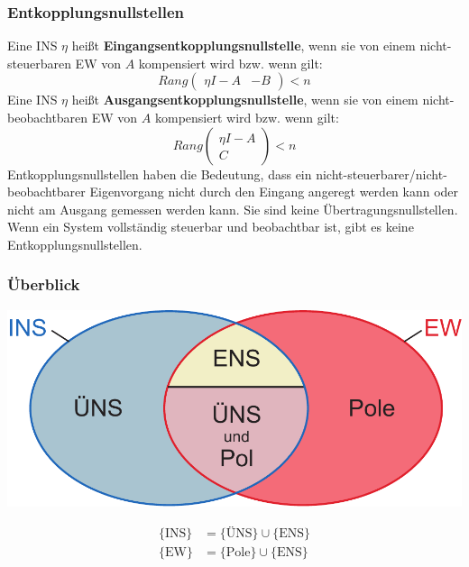 \documentclass[a4paper,twocolumn,10pt]{article}
\begin{document}
\subsubsection{Entkopplungsnullstellen}
Eine INS $\eta$ heißt \textbf{Eingangsentkopplungsnullstelle}, wenn sie von einem nicht-steuerbaren EW von $A$ kompensiert wird bzw. wenn gilt:
\begin{equation*}
Rang\begin{pmatrix}\eta I-A & -B\end{pmatrix}<n
\end{equation*}
Eine INS $\eta$ heißt \textbf{Ausgangsentkopplungsnullstelle}, wenn sie von einem nicht-beobachtbaren EW von $A$ kompensiert wird bzw. wenn gilt:
\begin{equation*}
Rang\begin{pmatrix}\eta I-A \\ C\end{pmatrix}<n
\end{equation*}
Entkopplungsnullstellen haben die Bedeutung, dass ein nicht-steuerbarer/nicht-beobachtbarer Eigenvorgang nicht durch den Eingang angeregt werden kann oder nicht am Ausgang gemessen werden kann. Sie sind keine Übertragungsnullstellen.\\
Wenn ein System vollständig steuerbar und beobachtbar ist, gibt es keine Entkopplungsnullstellen.

\subsubsection{Überblick}
\begin{center}
\includegraphics[width=0.8\columnwidth]{Grafiken/Pole_NS_Ueberblick}
\end{center}
\begin{align*}
\{\text{INS}\}&=\{\text{ÜNS}\}\cup\{\text{ENS}\}\\
\{\text{EW}\}&=\{\text{Pole}\}\cup\{\text{ENS}\}
\end{align*}
\end{document}
